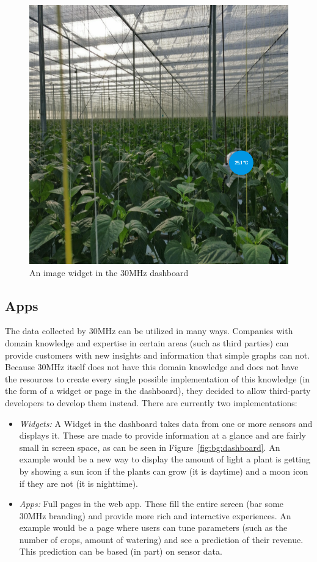 \begin{figure}[h]
  \includegraphics[width=\columnwidth]{figures/background/dashboard-img.png}
  \caption{An image widget in the 30MHz dashboard}
  \label{fig:bg:dashboard-img}
  \centering
\end{figure}

\subsection{Apps}\label{sec:bg:apps}
The data collected by 30MHz can be utilized in many ways. Companies with domain knowledge and expertise in certain areas (such as third parties) can provide customers with new insights and information that simple graphs can not. Because 30MHz itself does not have this domain knowledge and does not have the resources to create every single possible implementation of this knowledge (in the form of a widget or page in the dashboard), they decided to allow third-party developers to develop them instead. There are currently two implementations:

\begin{itemize}
  \item \emph{Widgets:} A Widget in the dashboard takes data from one or more sensors and displays it. These are made to provide information at a glance and are fairly small in screen space, as can be seen in Figure~\ref{fig:bg:dashboard}. An example would be a new way to display the amount of light a plant is getting by showing a sun icon if the plants can grow (it is daytime) and a moon icon if they are not (it is nighttime).
  \item \emph{Apps:} Full pages in the web app. These fill the entire screen (bar some 30MHz branding) and provide more rich and interactive experiences. An example would be a page where users can tune parameters (such as the number of crops, amount of watering) and see a prediction of their revenue. This prediction can be based (in part) on sensor data.
\end{itemize}

